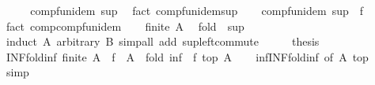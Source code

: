 \begin{isabellebody}
%
\endisadelimproof
%
\isatagproof
{}\isamarkupfalse%
\ {\isacharminus}{\kern0pt}\isanewline
\ \ \isamarkupfalse%
\ comp{\isacharunderscore}{\kern0pt}fun{\isacharunderscore}{\kern0pt}idem\ sup\ \isamarkupfalse%
\ {\isacharparenleft}{\kern0pt}fact\ comp{\isacharunderscore}{\kern0pt}fun{\isacharunderscore}{\kern0pt}idem{\isacharunderscore}{\kern0pt}sup{\isacharparenright}{\kern0pt}\isanewline
\ \ \isamarkupfalse%
\ comp{\isacharunderscore}{\kern0pt}fun{\isacharunderscore}{\kern0pt}idem\ {\isachardoublequoteopen}sup\ {\isasymcirc}\ f{\isachardoublequoteclose}\ \isamarkupfalse%
\ {\isacharparenleft}{\kern0pt}fact\ comp{\isacharunderscore}{\kern0pt}comp{\isacharunderscore}{\kern0pt}fun{\isacharunderscore}{\kern0pt}idem{\isacharparenright}{\kern0pt}\isanewline
\ \ \isamarkupfalse%
\ {\isacartoucheopen}finite\ A{\isacartoucheclose}\ \isamarkupfalse%
\ {\isachardoublequoteopen}{\isacharquery}{\kern0pt}fold\ {\isacharequal}{\kern0pt}\ {\isacharquery}{\kern0pt}sup{\isachardoublequoteclose}\isanewline
\ \ \ \ \isamarkupfalse%
\ {\isacharparenleft}{\kern0pt}induct\ A\ arbitrary{\isacharcolon}{\kern0pt}\ B{\isacharparenright}{\kern0pt}\ {\isacharparenleft}{\kern0pt}simp{\isacharunderscore}{\kern0pt}all\ add{\isacharcolon}{\kern0pt}\ sup{\isacharunderscore}{\kern0pt}left{\isacharunderscore}{\kern0pt}commute{\isacharparenright}{\kern0pt}\isanewline
\ \ \isamarkupfalse%
\ \isamarkupfalse%
\ {\isacharquery}{\kern0pt}thesis\ \isacommand{{\isachardot}{\kern0pt}{\isachardot}{\kern0pt}}\isamarkupfalse%
\isanewline
{}\isamarkupfalse%
%
\endisatagproof
{\isafoldproof}%
%
\isadelimproof
\isanewline
%
\endisadelimproof
\isanewline
{}\isamarkupfalse%
\ INF{\isacharunderscore}{\kern0pt}fold{\isacharunderscore}{\kern0pt}inf{\isacharcolon}{\kern0pt}\ {\isachardoublequoteopen}finite\ A\ {\isasymLongrightarrow}\ {\isasymSqinter}{\isacharparenleft}{\kern0pt}f\ {\isacharbackquote}{\kern0pt}\ A{\isacharparenright}{\kern0pt}\ {\isacharequal}{\kern0pt}\ fold\ {\isacharparenleft}{\kern0pt}inf\ {\isasymcirc}\ f{\isacharparenright}{\kern0pt}\ top\ A{\isachardoublequoteclose}\isanewline
%
\isadelimproof
\ \ %
\endisadelimproof
%
\isatagproof
{}\isamarkupfalse%
\ inf{\isacharunderscore}{\kern0pt}INF{\isacharunderscore}{\kern0pt}fold{\isacharunderscore}{\kern0pt}inf\ {\isacharbrackleft}{\kern0pt}of\ A\ top{\isacharbrackright}{\kern0pt}\ \isamarkupfalse%
\ simp%
\endisatagproof

\end{isabellebody}
